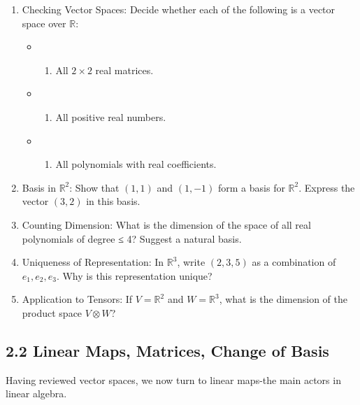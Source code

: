 \documentclass[
  letterpaper,
  DIV=11,
  numbers=noendperiod]{scrreprt}
\providecommand{\tightlist}{%
  \setlength{\itemsep}{0pt}\setlength{\parskip}{0pt}}
\begin{document}
\begin{enumerate}
\def\labelenumi{\arabic{enumi}.}
\item
  Checking Vector Spaces: Decide whether each of the following is a
  vector space over \(\mathbb{R}\):

  \begin{itemize}
  \tightlist
  \item
    \begin{enumerate}
    \def\labelenumii{(\alph{enumii})}
    \tightlist
    \item
      All \(2 \times 2\) real matrices.
    \end{enumerate}
  \item
    \begin{enumerate}
    \def\labelenumii{(\alph{enumii})}
    \setcounter{enumii}{1}
    \tightlist
    \item
      All positive real numbers.
    \end{enumerate}
  \item
    \begin{enumerate}
    \def\labelenumii{(\alph{enumii})}
    \setcounter{enumii}{2}
    \tightlist
    \item
      All polynomials with real coefficients.
    \end{enumerate}
  \end{itemize}
\item
  Basis in \(\mathbb{R}^2\): Show that \((1,1)\) and \((1,-1)\) form a
  basis for \(\mathbb{R}^2\). Express the vector \((3,2)\) in this
  basis.
\item
  Counting Dimension: What is the dimension of the space of all real
  polynomials of degree ≤ 4? Suggest a natural basis.
\item
  Uniqueness of Representation: In \(\mathbb{R}^3\), write \((2,3,5)\)
  as a combination of \(e_1, e_2, e_3\). Why is this representation
  unique?
\item
  Application to Tensors: If \(V = \mathbb{R}^2\) and
  \(W = \mathbb{R}^3\), what is the dimension of the product space
  \(V \otimes W\)?
\end{enumerate}

\subsection{2.2 Linear Maps, Matrices, Change of
Basis}\label{linear-maps-matrices-change-of-basis}

Having reviewed vector spaces, we now turn to linear maps-the main
actors in linear algebra.
\end{document}
